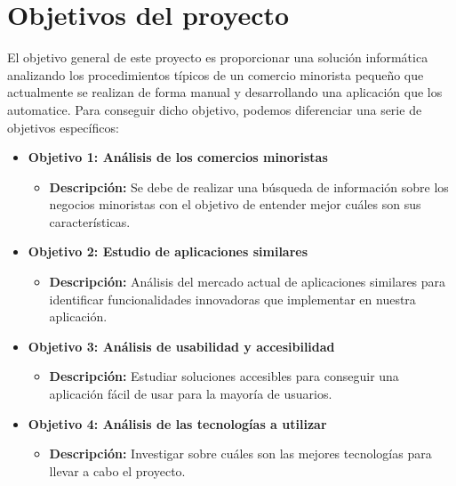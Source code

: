 \section{Objetivos del proyecto}
\label{sec:project_objectives}

El objetivo general de este proyecto es proporcionar una solución informática analizando los procedimientos típicos de un comercio minorista pequeño que actualmente se realizan de forma manual y desarrollando una aplicación que los automatice. Para conseguir dicho objetivo, podemos diferenciar una serie de objetivos específicos: 





\begin{itemize}
	\item \textbf{Objetivo 1: Análisis de los comercios minoristas}
	\begin{itemize}
		\item \textbf{Descripción:} Se debe de realizar una búsqueda de información sobre los negocios minoristas con el objetivo de entender mejor cuáles son sus características.
	\end{itemize}
	
	\item \textbf{Objetivo 2: Estudio de aplicaciones similares}
	\begin{itemize}
		\item \textbf{Descripción:} Análisis del mercado actual de aplicaciones similares para identificar funcionalidades innovadoras que implementar en nuestra aplicación.
	\end{itemize}
	
	\item \textbf{Objetivo 3: Análisis de usabilidad y accesibilidad}
	\begin{itemize}
		\item \textbf{Descripción:} Estudiar soluciones accesibles para conseguir una aplicación fácil de usar para la mayoría de usuarios.
	\end{itemize}
	
	\item \textbf{Objetivo 4: Análisis de las tecnologías a utilizar}
	\begin{itemize}
		\item \textbf{Descripción:} Investigar sobre cuáles son las mejores tecnologías para llevar a cabo el proyecto.
	\end{itemize}
	

\end{itemize}
